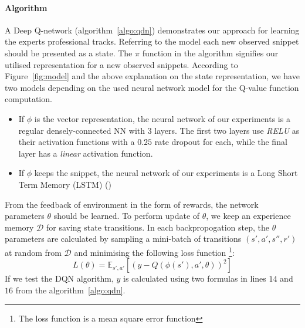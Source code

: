 \paragraph{Algorithm}
A Deep Q-network (algorithm~\ref{algo:qdn}) demonstrates our approach for learning the experts professional tracks. Referring to the model each new observed snippet should be presented as a state. The $\pi$ function in the algorithm signifies our utilised representation for a new observed snippets. According to Figure~\ref{fig:model} and the above explanation on the state representation, we have two models depending on the used neural network model for the Q-value function computation. 
\begin{itemize}
\item If $\phi$ is the vector representation, the neural network of our experiments is a regular densely-connected NN with $3$ layers. The first two layers use \textit{RELU} as their activation functions with a $0.25$ rate dropout for each, while the final layer has a \textit{linear} activation function. 
\item If $\phi$ keeps the snippet, the neural network of our experiments is a Long Short Term Memory (LSTM) ()
\end{itemize}

From the feedback of environment in the form of rewards, the network parameters $\theta$ should be learned. To perform update of $\theta$, we keep an experience memory $\mathcal{D}$ for saving state transitions. In each backpropogation step, the $\theta$ parameters are calculated by sampling a mini-batch of transitions $(s', a', s'', r')$ at random from $\mathcal{D}$ and minimising the following loss function \footnote{The loss function is a mean square error function}:
$$L(\theta) = \mathbb{E}_{s', a'}[(y - Q(\phi(s'), a', \theta ))^2]$$
If we test the DQN algorithm, $y$ is calculated using two formulas in lines $14$ and $16$ from the algorithm~\ref{algo:qdn}. 




